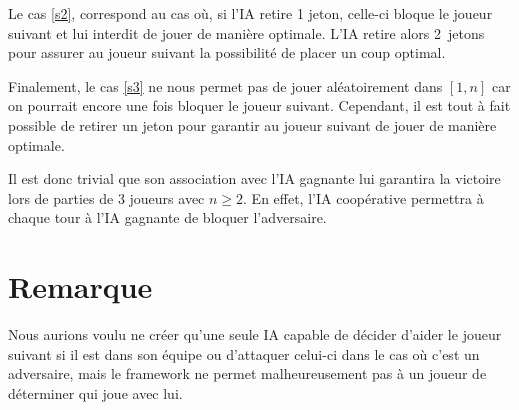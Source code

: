 \documentclass[10pt,a4paper]{article}
\begin{document}
Le cas \eqref{s2}, correspond au cas où, si l'IA retire 1 jeton, celle-ci bloque
le joueur suivant et lui interdit de jouer de manière optimale.
L'IA retire alors 2~jetons pour assurer au joueur suivant la possibilité de
placer un coup optimal.

Finalement, le cas \eqref{s3} ne nous
permet pas de jouer aléatoirement dans $[1, n]$ car on pourrait encore une fois
bloquer le joueur suivant. Cependant, il est tout à fait possible de retirer un
jeton pour garantir au joueur suivant de jouer de manière optimale.

Il est donc trivial que son association avec l'IA gagnante lui garantira
la victoire lors de parties de 3 joueurs avec $n \geq 2$.  En effet,
l'IA coopérative permettra à chaque tour à l'IA gagnante de bloquer
l'adversaire.

\section{Remarque}
Nous aurions voulu ne créer qu'une seule IA capable de décider d'aider le joueur
suivant si il est dans son équipe ou d'attaquer celui-ci dans le cas où c'est
un adversaire, mais le framework ne permet malheureusement
pas à un joueur de déterminer qui joue avec lui.
\end{document}
